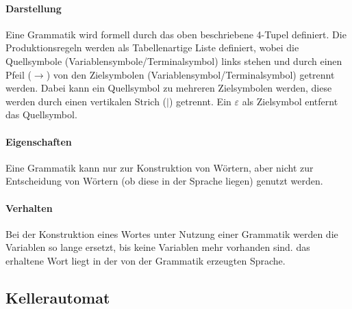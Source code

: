         \paragraph{Darstellung}
            Eine Grammatik wird formell durch das oben beschriebene 4-Tupel definiert. Die Produktionsregeln werden als Tabellenartige Liste definiert, wobei die Quellsymbole (Variablensymbole/Terminalsymbol) links stehen und durch einen Pfeil ($ \rightarrow $) von den Zielsymbolen (Variablensymbol/Terminalsymbol) getrennt werden. Dabei kann ein Quellsymbol zu mehreren Zielsymbolen werden, diese werden durch einen vertikalen Strich ($ | $) getrennt. Ein $ \varepsilon $ als Zielsymbol entfernt das Quellsymbol.

        \paragraph{Eigenschaften}
            Eine Grammatik kann nur zur Konstruktion von Wörtern, aber nicht zur Entscheidung von Wörtern (ob diese in der Sprache liegen) genutzt werden.

        \paragraph{Verhalten}
            Bei der Konstruktion eines Wortes unter Nutzung einer Grammatik werden die Variablen so lange ersetzt, bis keine Variablen mehr vorhanden sind. das erhaltene Wort liegt in der von der Grammatik erzeugten Sprache.


    \subsection{Kellerautomat}
